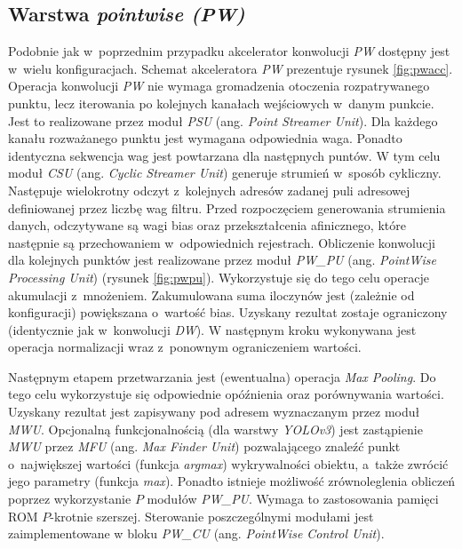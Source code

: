 \subsection{Warstwa \emph{pointwise (PW)}}

Podobnie jak w~poprzednim przypadku akcelerator konwolucji \emph{PW} dostępny jest w~wielu konfiguracjach.
Schemat akceleratora \emph{PW} prezentuje rysunek \ref{fig:pwacc}.
Operacja konwolucji \emph{PW} nie wymaga gromadzenia otoczenia rozpatrywanego punktu, lecz iterowania po kolejnych kanałach wejściowych w~danym punkcie.
Jest to realizowane przez moduł \emph{PSU} (ang. \emph{Point Streamer Unit}).
Dla każdego kanału rozważanego punktu jest wymagana odpowiednia waga.
Ponadto identyczna sekwencja wag jest powtarzana dla następnych puntów.
W tym celu moduł \emph{CSU} (ang. \emph{Cyclic Streamer Unit}) generuje strumień w~sposób cykliczny.
Następuje wielokrotny odczyt z~kolejnych adresów zadanej puli adresowej definiowanej przez liczbę wag filtru. 
Przed rozpoczęciem generowania strumienia danych, odczytywane są wagi bias oraz przekształcenia afinicznego, które następnie są przechowaniem w~odpowiednich rejestrach.
Obliczenie konwolucji dla kolejnych punktów jest realizowane przez moduł \emph{PW\_PU} (ang. \emph{PointWise Processing Unit}) (rysunek \ref{fig:pwpu}).
Wykorzystuje się do tego celu operacje akumulacji z~mnożeniem.
Zakumulowana suma iloczynów jest (zależnie od konfiguracji) powiększana o~wartość bias.
Uzyskany rezultat zostaje ograniczony (identycznie jak w~konwolucji \emph{DW}).
W następnym kroku wykonywana jest operacja normalizacji wraz z~ponownym ograniczeniem wartości.

Następnym etapem przetwarzania jest (ewentualna) operacja \emph{Max Pooling}.
Do tego celu wykorzystuje się odpowiednie opóźnienia oraz porównywania wartości.
Uzyskany rezultat jest zapisywany pod adresem wyznaczanym przez moduł \emph{MWU}.
Opcjonalną funkcjonalnością (dla warstwy \emph{YOLOv3}) jest zastąpienie \emph{MWU} przez \emph{MFU} (ang. \emph{Max Finder Unit}) pozwalającego znaleźć punkt o~największej wartości (funkcja \emph{argmax}) wykrywalności obiektu, a~także zwrócić jego parametry (funkcja \emph{max}).
Ponadto istnieje możliwość zrównoleglenia obliczeń poprzez wykorzystanie $P$ modułów \emph{PW\_PU}. 
Wymaga to zastosowania pamięci ROM $P$-krotnie szerszej. 
Sterowanie poszczególnymi modułami jest zaimplementowane w bloku \emph{PW\_CU} (ang. \emph{PointWise Control Unit}).

